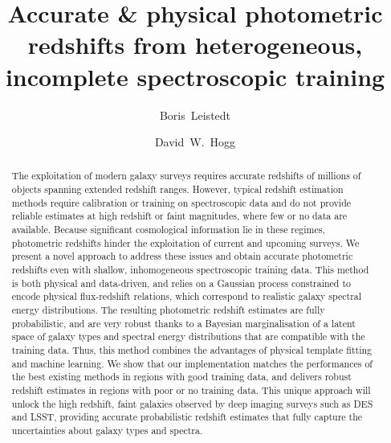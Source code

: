 \documentclass[aps,prd,showpacs,superscriptaddress,groupedaddress]{revtex4}  %
\begin{document}
 
\title{Accurate \& physical photometric redshifts from heterogeneous, incomplete spectroscopic training}

\author{Boris~Leistedt}
  
\author{David~W.~Hogg}
  
  
\begin{abstract}
	The exploitation of modern galaxy surveys requires accurate redshifts of millions of objects spanning extended redshift ranges. 
	However, typical redshift estimation methods require calibration or training on spectroscopic data and do not provide reliable estimates at high redshift or faint magnitudes, where few or no data are available.
	Because significant cosmological information lie in these regimes, photometric redshifts hinder the exploitation of current and upcoming surveys. 
	We present a novel approach to address these issues and obtain accurate photometric redshifts even with shallow, inhomogeneous spectroscopic training data. 
	This method is both physical and data-driven, and relies on a Gaussian process constrained to encode physical flux-redshift relations, which correspond to realistic galaxy spectral energy distributions.
	The resulting photometric redshift estimates are fully probabilistic, and are very robust thanks to a Bayesian marginalisation of a latent space of galaxy types and spectral energy distributions that are compatible with the training data.
	Thus, this method combines the advantages of physical template fitting and machine learning.
	We show that our implementation matches the performances of the best existing methods in regions with good training data, and delivers robust redshift estimates in regions with poor or no training data. 
	This unique approach will unlock the high redshift, faint galaxies observed by deep imaging surveys such as DES and LSST, providing accurate probabilistic redshift estimates that fully capture the uncertainties about galaxy types and spectra.
\end{abstract}


\maketitle
\end{document}
